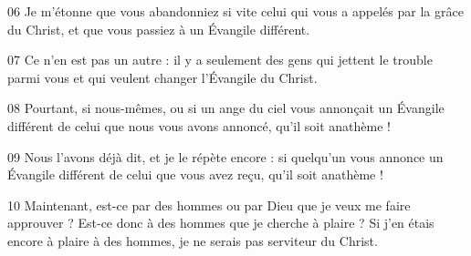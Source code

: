 
06 Je m’étonne que vous abandonniez si vite celui qui vous a appelés par la grâce du Christ, et que vous passiez à un Évangile différent.

07 Ce n'en est pas un autre : il y a seulement des gens qui jettent le trouble parmi vous et qui veulent changer l’Évangile du Christ.

08 Pourtant, si nous-mêmes, ou si un ange du ciel vous annonçait un Évangile différent de celui que nous vous avons annoncé, qu’il soit anathème !

09 Nous l’avons déjà dit, et je le répète encore : si quelqu’un vous annonce un Évangile différent de celui que vous avez reçu, qu’il soit anathème !

10 Maintenant, est-ce par des hommes ou par Dieu que je veux me faire approuver ? Est-ce donc à des hommes que je cherche à plaire ? Si j’en étais encore à plaire à des hommes, je ne serais pas serviteur du Christ.
